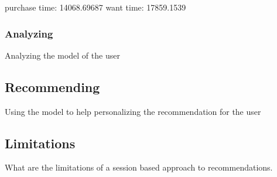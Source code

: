     purchase time: 14068.69687
    want time: 17859.1539



\subsubsection{Analyzing}
    Analyzing the model of the user

\subsection{Recommending}
    Using the model to help personalizing the recommendation for the user

\subsection{Limitations}
    What are the limitations of a session based approach to recommendations.

